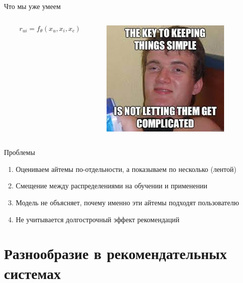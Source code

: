 \documentclass[11pt,aspectratio=169,handout]{beamer}
\begin{document}
\begin{frame}{Что мы уже умеем}

\begin{columns}

\begin{column}{0.55\textwidth}
\begin{center}
\begin{tcolorbox}[colback=info!5,colframe=info!80,title=]
\begin{large}
\[
\hat r_{ui} = f_{\theta}(x_u, x_i, x_c)
\]
\end{large}
\end{tcolorbox}\end{center}
\end{column}

\begin{column}{0.35\textwidth} 
\begin{center}
\includegraphics[scale=0.4]{images/simple.jpeg}
\end{center}
\end{column}
\end{columns}

\vfill

Проблемы
\begin{enumerate}[<+->]
\item {\color{blue} Оцениваем айтемы по-отдельности, а показываем по несколько (лентой)}
\item Смещение между распределениями на обучении и применении
\item Модель не объясняет, почему именно эти айтемы подходят пользователю
\item Не учитывается долгострочный эффект рекомендаций
\end{enumerate}

\end{frame}

\section{Разнообразие в рекомендательных системах}
\end{document}
